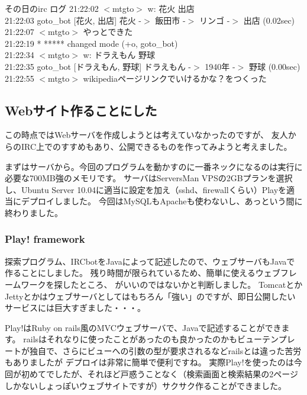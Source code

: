 \begin{itembox}{その日のirc ログ}
  21:22:02 $<$mtgto$>$ w: 花火 出店\\
  21:22:03 {goto\_bot} [花火, 出店] 花火 -$>$ 飯田市 -$>$ リンゴ -$>$ 出店 (0.02sec)\\
  21:22:07 $<$mtgto$>$ やっとできた\\
  21:22:19 * ***** changed mode (+o, goto\_bot)\\
  21:22:34 $<$mtgto$>$ w: ドラえもん 野球\\
  21:22:35 {goto\_bot} [ドラえもん, 野球] ドラえもん -$>$ 1940年 -$>$ 野球 (0.00sec)\\
  21:22:55 $<$mtgto$>$ wikipediaページリンクでいけるかな？をつくった
\end{itembox}

\subsection{Webサイト作ることにした}
この時点ではWebサーバを作成しようとは考えていなかったのですが、
友人からのIRC上でのすすめもあり、公開できるものを作ってみようと考えました。

まずはサーバから。今回のプログラムを動かすのに一番ネックになるのは実行に必要な700MB強のメモリです。
サーバはServersMan VPSの2GBプランを選択し、Ubuntu Server 10.04に適当に設定を加え（sshd、firewallくらい）Playを適当にデプロイしました。
今回はMySQLもApacheも使わないし、あっという間に終わりました。

\subsubsection{Play! framework}
探索プログラム、IRCbotをJavaによって記述したので、ウェブサーバもJavaで作ることにしました。
残り時間が限られているため、簡単に使えるウェブフレームワークを探したところ、
がいいのではないかと判断しました。
TomcatとかJettyとかはウェブサーバとしてはもちろん「強い」のですが、即日公開したいサービスには巨大すぎました・・・。

Play!はRuby on rails風のMVCウェブサーバで、Javaで記述することができます。
railsはそれなりに使ったことがあったのも良かったのかもビューテンプレートが独自で、さらにビューへの引数の型が要求されるなどrailsとは違った苦労もありましたが
デプロイは非常に簡単で便利ですね。
実際Play!を使ったのは今回が初めてでしたが、それほど戸惑うことなく（検索画面と検索結果の2ページしかないしょっぽいウェブサイトですが）サクサク作ることができました。

